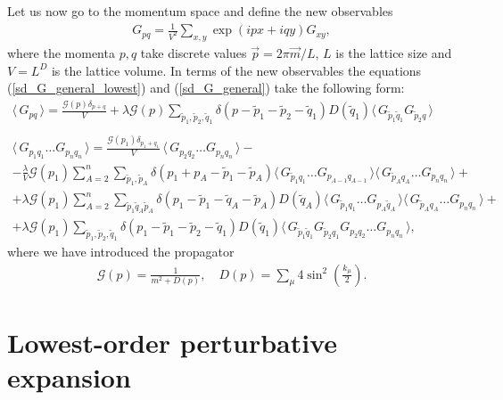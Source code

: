 \documentclass[twocolumn,showpacs,preprintnumbers,superscriptaddress,amsmath,floatfix,amssymb,secnumarabic]{revtex4}
\newcommand{\lr}[1]{ \left( #1 \right) }
\newcommand{\vev}[1]{ \langle \, #1 \, \rangle }
\newcommand{\expa}[1]{ \exp{\left( #1 \right)} }
\begin{document}
\begin{widetext}
Let us now go to the momentum space and define the new observables
\begin{eqnarray}
\label{momentum_space_observables}
 G_{p q} = \frac{1}{V^2} \sum\limits_{x, y} \expa{i p x + i q y} G_{x y},
\end{eqnarray}
where the momenta $p, q$ take discrete values $\vec{p} = 2 \pi \vec{m}/L$, $L$ is the lattice size and $V = L^D$ is the lattice volume. In terms of the new observables the equations (\ref{sd_G_general_lowest}) and (\ref{sd_G_general}) take the following form:
\begin{eqnarray}
\label{sd_G_general_fourier_lowest}
 \vev{G_{p q}} = \frac{\mathcal{G}\lr{p} \delta_{p+q}}{V} +
 \lambda \mathcal{G}\lr{p} \sum\limits_{\tilde{p}_1, \tilde{p}_2, \tilde{q}_1}
 \delta\lr{p - \tilde{p}_1 - \tilde{p}_2 - \tilde{q}_1} D\lr{\tilde{q}_1} \vev{G_{\tilde{p}_1 \tilde{q}_1} G_{\tilde{p}_2 q}}
 \\{}\nonumber\\
\label{sd_G_general_fourier}
 \vev{ G_{p_1 q_1} \ldots G_{p_n q_n} }
 =
  \frac{\mathcal{G}\lr{p_1} \delta_{p_1 + q_1}}{V} \, \vev{G_{p_2 q_2} \ldots G_{p_n q_n}}
 - \nonumber \\ -
 \frac{\lambda}{V} \mathcal{G}\lr{p_1} \sum\limits_{A=2}^{n} \sum\limits_{\tilde{p}_1, \tilde{p}_A} \delta\lr{p_1 + p_A - \tilde{p}_1 - \tilde{p}_A} \vev{G_{\tilde{p}_1 q_1} \ldots G_{p_{A-1} q_{A-1}}} \vev{G_{\tilde{p}_A q_A} \ldots G_{p_n q_n}}
 + \nonumber \\ +
 \lambda \mathcal{G}\lr{p_1} \sum\limits_{A=2}^{n}
 \sum\limits_{\tilde{p}_1 \tilde{q}_A \tilde{p}_A}
 \delta\lr{p_1 - \tilde{p}_1 - \tilde{q}_A - \tilde{p}_A}
 D\lr{\tilde{q}_A}
 \vev{G_{\tilde{p}_1 q_1} \ldots G_{p_{A} \tilde{q}_A}} \vev{G_{\tilde{p}_A q_A} \ldots G_{p_n q_n}}
 + \nonumber \\ +
 \lambda \mathcal{G}\lr{p_1} \sum\limits_{\tilde{p}_1, \tilde{p}_2, \tilde{q}_1}
 \delta\lr{p_1 - \tilde{p}_1 - \tilde{p}_2 - \tilde{q}_1} D\lr{\tilde{q}_1} \vev{G_{\tilde{p}_1 \tilde{q}_1} G_{\tilde{p}_2 q_1} G_{p_2 q_2} \ldots G_{p_n q_n}} ,
\end{eqnarray}
where we have introduced the propagator
\begin{eqnarray}
 \mathcal{G}\lr{p} = \frac{1}{m^2 + D\lr{p}},
 \quad
 D\lr{p} = \sum\limits_{\mu} 4 \sin^2\lr{\frac{k_{\mu}}{2}} .
\end{eqnarray}
\end{widetext}

\section*{Lowest-order perturbative expansion}
\end{document}
